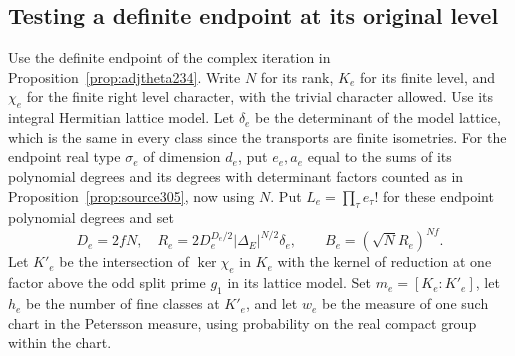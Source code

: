 \documentclass[a4paper,11pt]{article}
\theoremstyle{definition}
\theoremstyle{remark}
\numberwithin{equation}{section}
\begin{document}
\subsection{Testing a definite endpoint at its original level}\label{nav:V-57}
Use the definite endpoint of the complex iteration in
Proposition~\ref{prop:adjtheta234}. Write \(N\) for its
rank, \(K_e\) for its finite level, and \(\chi_e\) for the
finite right level character, with the trivial character
allowed. Use its integral Hermitian lattice model. Let
\(\delta_e\) be the determinant of the model lattice,
which is the same in every class since the transports are
finite isometries. For the endpoint real type \(\sigma_e\)
of dimension \(d_e\), put \(e_e,a_e\) equal to the sums of
its polynomial degrees and its degrees with determinant
factors counted as in Proposition~\ref{prop:source305},
now using \(N\). Put \(L_e=\prod_\tau e_\tau!\) for these
endpoint polynomial degrees and set
\[
 D_e=2fN,\quad R_e=2D_e^{D_e/2}|\Delta_E|^{N/2}\delta_e,
 \qquad B_e=(\sqrt N R_e)^{Nf}.
\]
Let \(K'_e\) be the intersection of \(\ker\chi_e\) in \(K_e\)
with the kernel of reduction at one factor above the odd
split prime \(g_1\) in its lattice model. Set
\(m_e=[K_e:K'_e]\), let \(h_e\) be the number of fine
classes at \(K'_e\), and let \(w_e\) be the measure of one
such chart in the Petersson measure, using probability on
the real compact group within the chart.
\end{document}
